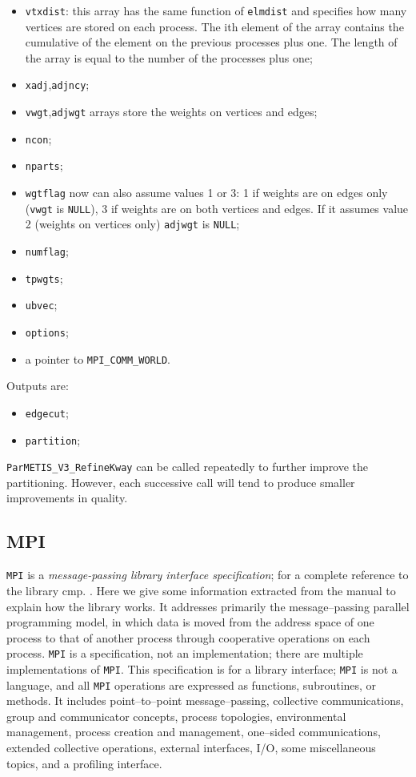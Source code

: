 \begin{itemize}
\item \verb|vtxdist|: this array has the same function of \verb|elmdist| and specifies how many vertices are stored on each process. The ith element of the array contains the cumulative of the element on the previous processes plus one. The length of the array is equal to the number of the processes plus one;
\item \verb|xadj|,\verb|adjncy|;
\item \verb|vwgt|,\verb|adjwgt| arrays store the weights on vertices and edges;
\item \verb|ncon|;
\item \verb|nparts|;
\item \verb|wgtflag| now can also assume values 1 or 3: 1 if weights are on edges only (\verb|vwgt| is \verb|NULL|), 3 if weights are on both vertices and edges. If it assumes value 2 (weights on vertices only) \verb|adjwgt| is \verb|NULL|;
\item \verb|numflag|;
\item \verb|tpwgts|;
\item \verb|ubvec|;
\item \verb|options|;
\item a pointer to \verb|MPI_COMM_WORLD|.
\end{itemize}

Outputs are:

\begin{itemize}
\item \verb|edgecut|;
\item \verb|partition|;
\end{itemize}

\verb|ParMETIS_V3_RefineKway| can be called repeatedly to further improve the partitioning. However, each successive call will tend to produce smaller improvements in quality.

\subsection{MPI}\label{subsection:mpi}
\verb|MPI| is a \textit{message-passing library interface specification}; for a complete reference to the library cmp. \cite{mpi}. Here we give some information extracted from the manual to explain how the library works. It addresses primarily the message--passing parallel programming model, in which data is moved from the address space of one process to that of another process through cooperative operations on each process. \verb|MPI| is a specification, not an implementation; there are multiple implementations of \verb|MPI|. This specification is for a library interface; \verb|MPI| is not a language, and all \verb|MPI| operations are expressed as functions, subroutines, or methods. It includes point--to--point message--passing, collective communications, group and communicator concepts, process topologies, environmental management, process creation and management, one--sided communications, extended collective operations, external interfaces, I/O, some miscellaneous topics, and a profiling interface.

